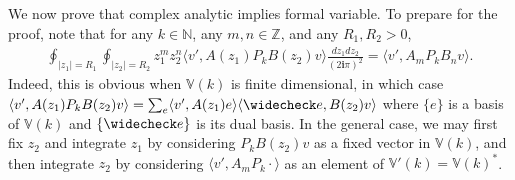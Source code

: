 \documentclass[12pt,a4paper,notitlepage]{article}
\theoremstyle{definition}
\theoremstyle{plain}
\newcommand{\wch}{\widecheck}
\newcommand{\bk}[1]{\langle {#1}\rangle}
\newcommand{\im}{\mathbf{i}}
\newcommand{\Vbb}{\mathbb V}
\newcommand{\Nbb}{\mathbb N}
\newcommand{\Zbb}{\mathbb Z}
\numberwithin{equation}{section}
\begin{document}
\subsection{}\label{lb69}

We now prove that complex analytic implies formal variable. To prepare for the proof, note that for any $k\in\Nbb$, any $m,n\in\Zbb$, and any $R_1,R_2>0$,
\begin{align}
	\oint_{|z_1|=R_1}\oint_{|z_2|=R_2}z_1^mz_2^n\bk{v',A(z_1)P_kB(z_2)v}\frac {dz_1dz_2}{(2\im\pi)^2}=\bk{v',A_mP_kB_nv}.\label{eq101}
\end{align}
Indeed, this is obvious when $\Vbb(k)$ is finite dimensional, in which case $\bk{v',A(z_1)P_kB(z_2)v}=\sum_e \bk{v',A(z_1)e}\bk{\wch e,B(z_2)v}$ where $\{e\}$ is a basis of $\Vbb(k)$ and $\{\wch e\}$ is its dual basis. In the general case, we may first fix $z_2$ and integrate $z_1$ by considering $P_kB(z_2)v$ as a fixed vector in $\Vbb(k)$, and then integrate $z_2$ by considering $\bk{v',A_mP_k \cdot}$ as an element of $\Vbb'(k)=\Vbb(k)^*$.
\end{document}
